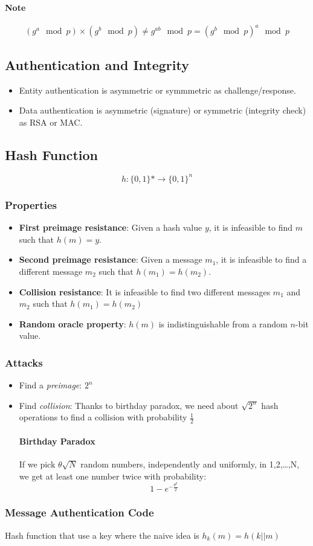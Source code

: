 \paragraph{Note}$$(g^a\mod p)\times (g^b \mod p) \ne g^{ab} \mod p = (g^b \mod p)^a \mod p$$


\subsection{Authentication and Integrity}
\begin{itemize}
    \item Entity authentication is asymmetric or symmmetric as
        challenge/response.
    \item Data authentication is
        asymmetric (signature) or symmetric (integrity check) as RSA or
        MAC.
\end{itemize}

\subsection{Hash Function}

$$h:\{0,1\}*\rightarrow\{0,1\}^n$$

\subsubsection{Properties}

\begin{itemize}
    \item \textbf{First preimage resistance}: Given a hash value $y$, it is infeasible to
        find $m$ such that $h(m) = y$.
    \item \textbf{Second preimage resistance}: Given a message $m_1$, it is infeasible
        to find a different message $m_2$ such that $h(m_1)=h(m_2)$.
    \item \textbf{Collision resistance}: It is infeasible to find two different messages
        $m_1$ and $m_2$ such that $h(m_1)=h(m_2)$
    \item \textbf{Random oracle property}: $h(m)$ is indistinguishable from a
        random $n$-bit value.
\end{itemize}

\subsubsection{Attacks}
\begin{itemize}
    \item Find a \textit{preimage}: $2^n$
    \item Find \textit{collision}: Thanks to birthday paradox,
        we need about $\sqrt{2^n}$ hash operations to find a
        collision with probability $\frac{1}{2}$

        \paragraph{Birthday Paradox} If we pick $\theta\sqrt{N}$ random numbers,
        independently and uniformly, in {1,2,\ldots,N}, we get at least one number twice
        with probability:
        $$1-e^{-\frac{\theta^2}{2}}$$
\end{itemize}

\subsubsection{Message Authentication Code} 
Hash function that use a key where the naive idea is $h_k(m) = h(k||m)$

